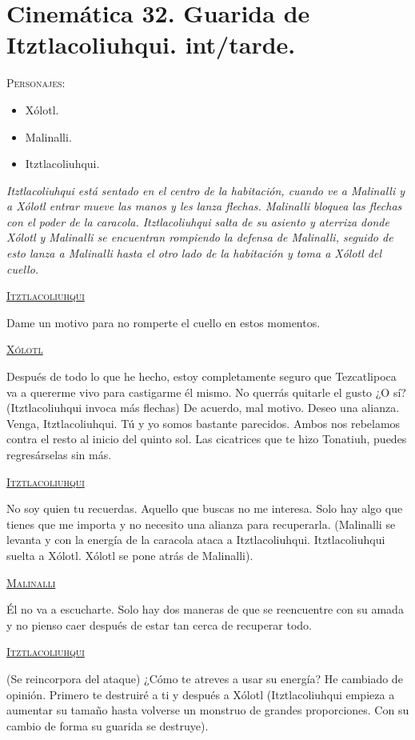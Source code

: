 \section{Cinemática 32. Guarida de Itztlacoliuhqui. int/tarde.} \label{Cin:Cinematica32}
 \textsc{Personajes}:
 \begin{itemize}
 \item Xólotl.
 \item Malinalli.
 \item Itztlacoliuhqui.
 \end{itemize}
\textit{Itztlacoliuhqui está sentado en el centro de la habitación, cuando ve a Malinalli y a Xólotl entrar mueve las manos y les lanza flechas. Malinalli bloquea las flechas con el poder de la caracola. Itztlacoliuhqui salta de su asiento y aterriza donde Xólotl y Malinalli se encuentran rompiendo la defensa de Malinalli, seguido de esto lanza a Malinalli hasta el otro lado de la habitación y toma a Xólotl del cuello.}
\begin{center}
\textsc{\underline{Itztlacoliuhqui}}
\\
\par
Dame un motivo para no romperte el cuello en estos momentos.
\\
\par
\textsc{\underline{Xólotl}}
\\
\par
Después de todo lo que he hecho, estoy completamente seguro que Tezcatlipoca va a quererme vivo para castigarme él mismo. No querrás quitarle el gusto ¿O sí?  (Itztlacoliuhqui invoca más flechas) De acuerdo, mal motivo. Deseo una alianza. Venga, Itztlacoliuhqui. Tú y yo somos bastante parecidos. Ambos nos rebelamos contra el resto al inicio del quinto sol. Las cicatrices que te hizo Tonatiuh, puedes regresárselas sin más.
\\
\par
\textsc{\underline{Itztlacoliuhqui}}
\\
\par
No soy quien tu recuerdas. Aquello que buscas no me interesa. Solo hay algo que tienes que me importa y no necesito una alianza para recuperarla. (Malinalli se levanta y con la energía de la caracola ataca a Itztlacoliuhqui. Itztlacoliuhqui suelta a Xólotl. Xólotl se pone atrás de Malinalli).
\\
\par
\textsc{\underline{Malinalli}}
\\
\par
Él no va a escucharte. Solo hay dos maneras de que se reencuentre con su amada y no pienso caer después de estar tan cerca de recuperar todo.
\\
\par
\textsc{\underline{Itztlacoliuhqui}}
\\
\par
(Se reincorpora del ataque) ¿Cómo te atreves a usar su energía? He cambiado de opinión. Primero te destruiré a ti y después a Xólotl (Itztlacoliuhqui empieza a aumentar su tamaño hasta volverse un monstruo de grandes proporciones. Con su cambio de forma su guarida se destruye).
\end{center}